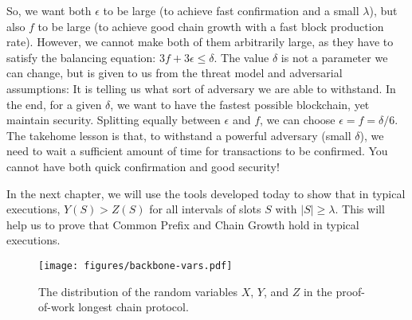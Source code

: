 So, we want both  $\epsilon$ to be large (to achieve fast confirmation and a small $\lambda$), but also $f$ to be large (to achieve good chain growth with a fast block production rate). However, we cannot make both of them arbitrarily large, as they have to satisfy the balancing equation: $3f + 3\epsilon \leq \delta$. The value $\delta$ is not a parameter we can change, but is given to us from the threat model and adversarial assumptions: It is telling us what sort of adversary we are able to withstand. In the end, for a given $\delta$, we want to have the fastest possible blockchain, yet maintain security. Splitting equally between $\epsilon$ and $f$, we can choose $\epsilon = f = \delta/6$. The takehome lesson is that, to withstand a powerful adversary (small $\delta$), we need to wait a sufficient amount of time for transactions to be confirmed. You cannot have both quick confirmation and good security!

In the next chapter, we will use the tools developed today to show that in typical executions, $Y(S) > Z(S)$ for all intervals of slots $S$ with $|S|\geq \lambda$. This will help us to prove that Common Prefix and Chain Growth hold in typical executions.

\begin{landscape}\centering
\begin{figure*}
    \centering
    \vspace*{\fill}
    \texttt{[image: figures/backbone-vars.pdf]}
    \caption{The distribution of the random variables $X$, $Y$, and $Z$ in the proof-of-work longest chain protocol.}
    \label{fig.balancing_eq}
    \vspace*{\fill}
\end{figure*}
\end{landscape}

